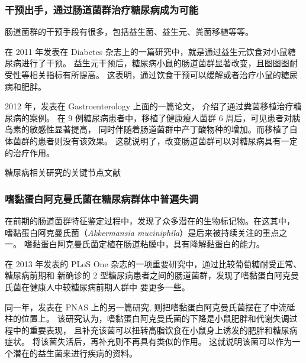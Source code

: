 \documentclass[]{ctexbook}
\begin{document}
\hypertarget{ux5e72ux9884ux51faux624bux901aux8fc7ux80a0ux9053ux83ccux7fa4ux6cbbux7597ux7cd6ux5c3fux75c5ux6210ux4e3aux53efux80fd}{%
\subsubsection{干预出手，通过肠道菌群治疗糖尿病成为可能}\label{ux5e72ux9884ux51faux624bux901aux8fc7ux80a0ux9053ux83ccux7fa4ux6cbbux7597ux7cd6ux5c3fux75c5ux6210ux4e3aux53efux80fd}}

肠道菌群的干预手段有很多，包括益生菌、益生元、粪菌移植等等。

在 2011 年发表在 Diabetes 杂志上的一篇研究中，就是通过益生元饮食对小鼠糖尿病进行了干预。
益生元干预后，糖尿病小鼠的肠道菌群显著改变，且图图图耐受性等相关指标有所提高。
这表明，通过饮食干预可以缓解或者治疗小鼠的糖尿病和肥胖\citep{everardResponsesGutMicrobiota2011}。

2012 年，发表在 Gastroenterology 上面的一篇论文，
介绍了通过粪菌移植治疗糖尿病的案例\citep{vriezeTransferIntestinalMicrobiota2012}。
在 9 例糖尿病患者中，移植了健康瘦人菌群 6 周后，可见患者对胰岛素的敏感性显著提高，
同时伴随着肠道菌群中产丁酸物种的增加。而移植了自体菌群的患者则没有该效果。
这就说明了，改变肠道菌群可以对糖尿病具有一定的治疗作用。

\hypertarget{htmlwidget-381fe1758c7ce67fac52}{}

\label{fig:diabetes-histplot-articles}糖尿病相关研究的关键节点文献

\hypertarget{ux55dcux9ecfux86cbux767dux963fux514bux66fcux6c0fux83ccux5728ux7cd6ux5c3fux75c5ux7fa4ux4f53ux4e2dux666eux904dux5931ux8c03}{%
\subsubsection{嗜黏蛋白阿克曼氏菌在糖尿病群体中普遍失调}\label{ux55dcux9ecfux86cbux767dux963fux514bux66fcux6c0fux83ccux5728ux7cd6ux5c3fux75c5ux7fa4ux4f53ux4e2dux666eux904dux5931ux8c03}}

在前期的肠道菌群特征鉴定过程中，发现了众多潜在的生物标记物。在这其中，
嗜黏蛋白阿克曼氏菌（\emph{Akkermansia muciniphila}）是后来被持续关注的重点之一。
嗜黏蛋白阿克曼氏菌定植在肠道粘膜中，具有降解黏蛋白的能力。

在 2013 年发表的 PLoS One 杂志的一项重要研究中，通过比较葡萄糖耐受正常、糖尿病前期和
新确诊的 2 型糖尿病患者之间的肠道菌群，发现了嗜黏蛋白阿克曼氏菌在健康人中较糖尿病前期人群中
要更多一些\citep{zhangHumanGutMicrobiota2013}。

同一年，发表在 PNAS 上的另一篇研究,
则把嗜黏蛋白阿克曼氏菌摆在了中流砥柱的位置上\citep{everardCrosstalkAkkermansiaMuciniphila2013}。
该研究认为，嗜黏蛋白阿克曼氏菌的下降是小鼠肥胖和代谢失调过程中的重要表现，
且补充该菌可以扭转高脂饮食在小鼠身上诱发的肥胖和糖尿病症状。
将该菌失活后，再补充则不再具有类似的作用。
这就说明该菌可以作为一个潜在的益生菌来进行疾病的资料。
\end{document}
